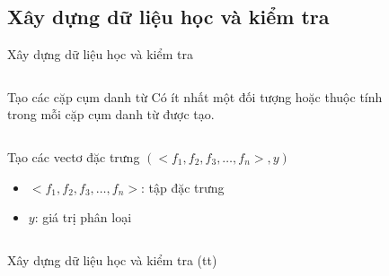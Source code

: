 \documentclass[9pt,xcolor=table,hyperref=unicode]{beamer}
\begin{document}
	\subsection{Xây dựng dữ liệu học và kiểm tra}
	\begin{frame}{Xây dựng dữ liệu học và kiểm tra}				
		\begin{columns}[t]
			\begin{column}{0.4\textwidth}
			   	\begin{block}{Tạo các cặp cụm danh từ}
					Có ít nhất một đối tượng hoặc thuộc tính trong mỗi cặp cụm danh từ được tạo.
				\end{block}
			\end{column}
			\begin{column}{0.6\textwidth}  %
			 	\begin{figure}[H]
					\LARGE 
					\centering				
					\resizebox{65mm}{!}{}	
				\end{figure}
			\end{column}
		\end{columns}
		\begin{columns}[t]
			\begin{column}{\textwidth}
			   	\begin{block}{Tạo các vectơ đặc trưng}										
					$(<f_{1},f_{2},f_{3},…,f_{n}>, y)$
					\begin{itemize}
						\item{$<f_{1},f_{2},f_{3},…,f_{n}>$: tập đặc trưng}
						\item{$y$: giá trị phân loại}										
					\end{itemize}
				\end{block}					
			\end{column}			
		\end{columns}
	\end{frame}	

	\begin{frame}{Xây dựng dữ liệu học và kiểm tra (tt)}		
		\begin{table}[]		
		\parbox{\textwidth}{
			\centering			
			\fontsize{6pt}{7}\selectfont		
				
			\caption{Các đặc trưng được sử dụng trong hệ thống}
		}
		\end{table}
		\hypertarget{features}{}		
	\end{frame}	
\end{document}
